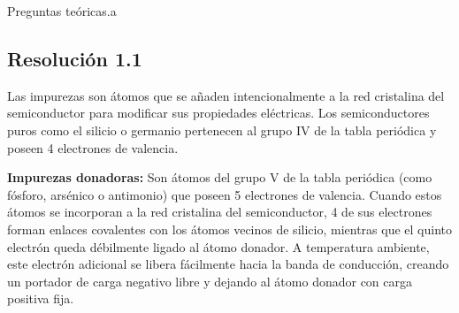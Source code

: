 \documentclass[
  11pt,
  letterpaper,
   addpoints,
  ]{exam}
\begin{document}
\begin{questions}
    \question Preguntas teóricas.a

\begin{solution}
\subsection*{Resolución 1.1}
Las impurezas son átomos que se añaden intencionalmente a la red cristalina del semiconductor para modificar sus propiedades eléctricas. Los semiconductores puros como el silicio o germanio pertenecen al grupo IV de la tabla periódica y poseen 4 electrones de valencia.

\textbf{Impurezas donadoras:} Son átomos del grupo V de la tabla periódica (como fósforo, arsénico o antimonio) que poseen 5 electrones de valencia. Cuando estos átomos se incorporan a la red cristalina del semiconductor, 4 de sus electrones forman enlaces covalentes con los átomos vecinos de silicio, mientras que el quinto electrón queda débilmente ligado al átomo donador. A temperatura ambiente, este electrón adicional se libera fácilmente hacia la banda de conducción, creando un portador de carga negativo libre y dejando al átomo donador con carga positiva fija.


\end{solution}
\end{questions}
\end{document}
